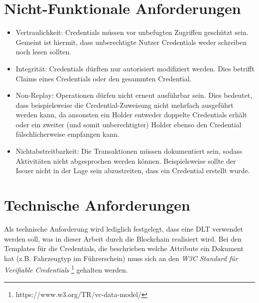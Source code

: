 \section{Nicht-Funktionale Anforderungen}

\begin{itemize}
	\item Vertraulichkeit: Credentials müssen vor unbefugten Zugriffen geschützt sein. Gemeint ist hiermit, dass unberechtigte Nutzer Credentials weder schreiben noch lesen sollten.
	\item Integrität: Credentials dürften nur autorisiert modifiziert werden. Dies betrifft Claims eines Credentials oder den gesammten Credential.
	\item Non-Replay: Operationen dürfen nicht erneut ausführbar sein. Dies bedeutet, dass beispielsweise die Credential-Zuweisung nicht mehrfach ausgeführt werden kann, da ansonsten ein Holder entweder doppelte Credentials erhält oder ein zweiter (und somit unberechtigter) Holder ebenso den Credential fälschlicherweise empfangen kann.
	\item Nichtabstreitbarkeit: Die Transaktionen müssen dokumentiert sein, sodass Aktivitäten nicht abgesprochen werden können. Beispielsweise sollte der Issuer nicht in der Lage sein abzustreiten, dass ein Credential erstellt wurde.
	
\end{itemize}

\section{Technische Anforderungen}
Als technische Anforderung wird lediglich festgelegt, dass eine DLT verwendet werden soll, was in dieser Arbeit durch die Blockchain realisiert wird.
Bei den Templates für die Credentials, die beschrieben welche Attribute ein Dokument hat (z.B. Fahrzeugtyp im Führerschein) muss sich an den \textsl{W3C Standard für Verifiable Credentials} \footnote{https://www.w3.org/TR/vc-data-model/} gehalten werden. 